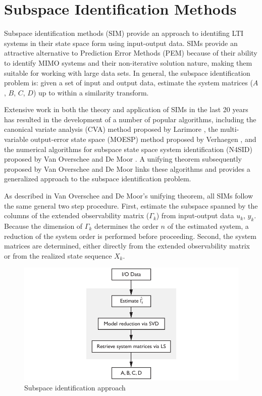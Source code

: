 \chapter{Subspace Identification Methods}
Subspace identification methods (SIM) provide an approach to identifing LTI systems in their state space form using input-output data. SIMs provide an attractive alternative to Prediction Error Methods (PEM) because of their ability to identify MIMO systems and their non-iterative solution nature, making them suitable for working with large data sets. In general, the subspace identification problem is: given a set of input and output data, estimate the system matrices ($A$, $B$, $C$, $D$) up to within a similarity transform. 

Extensive work in both the theory and application of SIMs in the last 20 years has resulted in the development of a number of popular algorithms, including the canonical variate analysis (CVA) method proposed by Larimore \cite{larimore1990canonical}, the multi-variable output-error state space (MOESP) method proposed by Verhaegen \cite{verhaegen1992subspace}, and the numerical algorithms for subspace state space system identification (N4SID) proposed by Van Overschee and De Moor \cite{van1994n4sid}. A unifying theorem subsequently proposed by Van Overschee and De Moor \cite{van1995unifying} links these algorithms and provides a generalized approach to the subspace identification problem.  

As described in Van Overschee and De Moor's unifying theorem, all SIMs follow the same general two step procedure. First, estimate the subspace spanned by the columns of the extended observability matrix ($\Gamma_k$) from input-output data $u_k$, $y_k$. Because the dimension of $\Gamma_k$ determines the order $n$ of the estimated system, a reduction of the system order is performed before proceeding. Second, the system matrices are determined, either directly from the extended observability matrix or from the realized state sequence $X_k$.
\begin{figure}[htb!]
	\centering
	\includegraphics{../fig/sim_flow_diagram.pdf}
	\caption{Subspace identification approach}
\end{figure}


